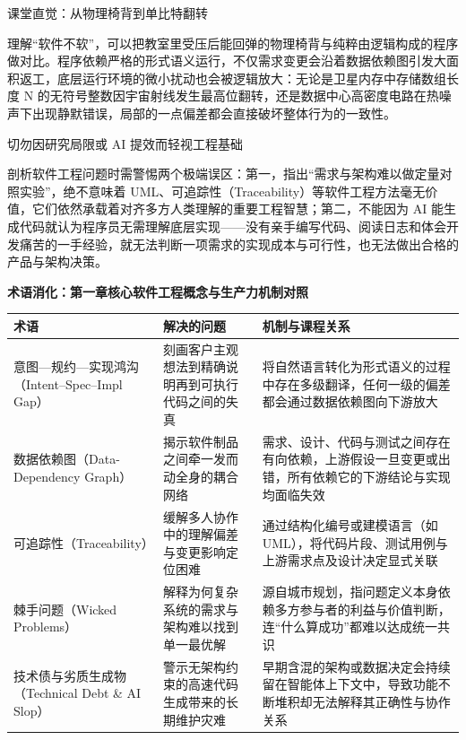 \documentclass[UTF8,a4paper,11pt,fontset=fandol]{ctexart}
\begin{document}
\begin{knowledgebox}{课堂直觉：从物理椅背到单比特翻转}

理解“软件不软”，可以把教室里受压后能回弹的物理椅背与纯粹由逻辑构成的程序做对比。程序依赖严格的形式语义运行，不仅需求变更会沿着数据依赖图引发大面积返工，底层运行环境的微小扰动也会被逻辑放大：无论是卫星内存中存储数组长度 N 的无符号整数因宇宙射线发生最高位翻转，还是数据中心高密度电路在热噪声下出现静默错误，局部的一点偏差都会直接破坏整体行为的一致性。

\end{knowledgebox}

\begin{warningbox}{切勿因研究局限或 AI 提效而轻视工程基础}

剖析软件工程问题时需警惕两个极端误区：第一，指出“需求与架构难以做定量对照实验”，绝不意味着 UML、可追踪性（Traceability）等软件工程方法毫无价值，它们依然承载着对齐多方人类理解的重要工程智慧；第二，不能因为 AI 能生成代码就认为程序员无需理解底层实现——没有亲手编写代码、阅读日志和体会开发痛苦的一手经验，就无法判断一项需求的实现成本与可行性，也无法做出合格的产品与架构决策。

\end{warningbox}

\par{}\textbf{术语消化：第一章核心软件工程概念与生产力机制对照}

\begin{center}\small\begin{tabularx}{\linewidth}{YYY}

\toprule

术语 & 解决的问题 & 机制与课程关系\\\midrule

意图—规约—实现鸿沟（Intent–Spec–Impl Gap） & 刻画客户主观想法到精确说明再到可执行代码之间的失真 & 将自然语言转化为形式语义的过程中存在多级翻译，任何一级的偏差都会通过数据依赖图向下游放大\\[3pt]

数据依赖图（Data-Dependency Graph） & 揭示软件制品之间牵一发而动全身的耦合网络 & 需求、设计、代码与测试之间存在有向依赖，上游假设一旦变更或出错，所有依赖它的下游结论与实现均面临失效\\[3pt]

可追踪性（Traceability） & 缓解多人协作中的理解偏差与变更影响定位困难 & 通过结构化编号或建模语言（如 UML），将代码片段、测试用例与上游需求点及设计决定显式关联\\[3pt]

棘手问题（Wicked Problems） & 解释为何复杂系统的需求与架构难以找到单一最优解 & 源自城市规划，指问题定义本身依赖多方参与者的利益与价值判断，连“什么算成功”都难以达成统一共识\\[3pt]

技术债与劣质生成物（Technical Debt \& AI Slop） & 警示无架构约束的高速代码生成带来的长期维护灾难 & 早期含混的架构或数据决定会持续留在智能体上下文中，导致功能不断堆积却无法解释其正确性与协作关系\\[3pt]

\bottomrule\end{tabularx}\end{center}
\end{document}
